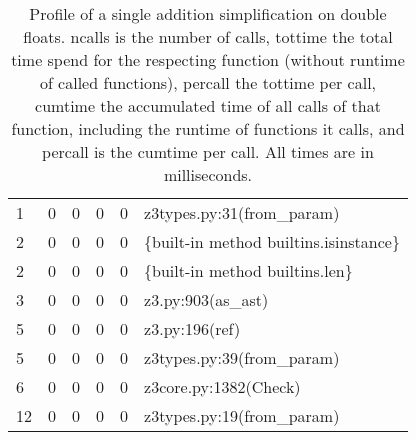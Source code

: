 \documentclass[a4paper,UKenglish,cleveref, autoref, thm-restate]{lipics-v2019}
\begin{document}
\begin{table}[]
\begin{tabular}{lllll|l}
		1      & 0       & 0       & 0       & 0       & z3types.py:31(from\_param)                          \\
		2      & 0       & 0       & 0       & 0       & \{built-in method builtins.isinstance\}             \\
		2      & 0       & 0       & 0       & 0       & \{built-in method builtins.len\}                    \\
		3      & 0       & 0       & 0       & 0       & z3.py:903(as\_ast)                                  \\
		5      & 0       & 0       & 0       & 0       & z3.py:196(ref)                                      \\
		5      & 0       & 0       & 0       & 0       & z3types.py:39(from\_param)                          \\
		6      & 0       & 0       & 0       & 0       & z3core.py:1382(Check)                               \\
		12     & 0       & 0       & 0       & 0       & z3types.py:19(from\_param)                         
	\end{tabular}
	\caption{Profile of a single addition simplification on double floats. ncalls is the number of calls, tottime the total time spend for the respecting function (without runtime of called functions), percall the tottime per call, cumtime the accumulated time of all calls of that function, including the runtime of functions it calls, and percall is the cumtime per call. All times are in milliseconds.}
	\label{tab:singleadditionsimplify}
\end{table}
\end{document}
